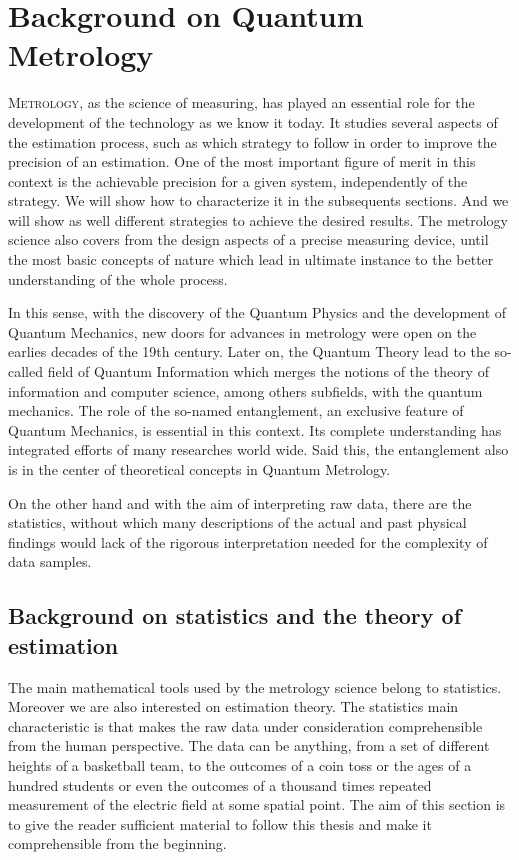 \section[Backgroud on Quantum Metrology]
{Background on Quantum Metrology}



\vspace{0pt}
\lettrine[lines=2, findent=3pt,nindent=0pt]{M}{etrology}, as the science of measuring, has played an essential role for the development of the technology as we know it today.
It studies several aspects of the estimation process, such as which strategy to follow in order to improve the precision of an estimation.
One of the most important figure of merit in this context is the achievable precision for a given system, independently of the strategy.
We will show how to characterize it in the subsequents sections.
And we will show as well different strategies to achieve the desired results.
The metrology science also covers from the design aspects of a precise measuring device, until the most basic concepts of nature which lead in ultimate instance to the better understanding of the whole process.

In this sense, with the discovery of the Quantum Physics and the development of Quantum Mechanics, new doors for advances in metrology were open on the earlies decades of the 19th century.
Later on, the Quantum Theory lead to the so-called field of Quantum Information which merges the notions of the theory of information and computer science, among others subfields, with the quantum mechanics.
The role of the so-named entanglement, an exclusive feature of Quantum Mechanics, is essential in this context.
Its complete understanding has integrated efforts of many researches world wide.
Said this, the entanglement also is in the center of theoretical concepts in Quantum Metrology.

On the other hand and with the aim of interpreting raw data, there are the statistics, without which many descriptions of the actual and past physical findings would lack of the rigorous interpretation needed for the complexity of data samples.



\subsection{Background on statistics and the theory of estimation}
The main mathematical tools used by the metrology science belong to statistics.
Moreover we are also interested on estimation theory.
The statistics main characteristic is that makes the raw data under consideration comprehensible from the human perspective.
The data can be anything, from a set of different heights of a basketball team, to the outcomes of a coin toss or the ages of a hundred students or even the outcomes of a thousand times repeated measurement of the electric field at some spatial point.
The aim of this section is to give the reader sufficient material to follow this thesis and make it comprehensible from the beginning.

